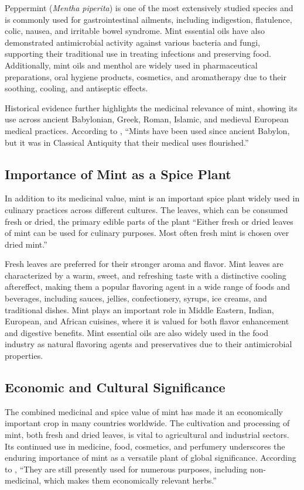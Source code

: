 Peppermint (\textit{Mentha piperita}) is one of the most extensively studied species and is commonly used for gastrointestinal ailments, including indigestion, flatulence, colic, nausea, and irritable bowel syndrome. Mint essential oils have also demonstrated antimicrobial activity against various bacteria and fungi, supporting their traditional use in treating infections and preserving food. Additionally, mint oils and menthol are widely used in pharmaceutical preparations, oral hygiene products, cosmetics, and aromatherapy due to their soothing, cooling, and antiseptic effects.

Historical evidence further highlights the medicinal relevance of mint, showing its use across ancient Babylonian, Greek, Roman, Islamic, and medieval European medical practices. According to \textcite{Silva2020}, ``Mints have been used since ancient Babylon, but it was in Classical Antiquity that their medical uses flourished.''

\subsection{Importance of Mint as a Spice Plant}
In addition to its medicinal value, mint is an important spice plant widely used in culinary practices across different cultures. The leaves, which can be consumed fresh or dried, the primary edible parts of the plant ``Either fresh or dried leaves of mint can be used for culinary purposes. Most often fresh mint is chosen over dried mint.''

Fresh leaves are preferred for their stronger aroma and flavor. Mint leaves are characterized by a warm, sweet, and refreshing taste with a distinctive cooling aftereffect, making them a popular flavoring agent in a wide range of foods and beverages, including sauces, jellies, confectionery, syrups, ice creams, and traditional dishes. Mint plays an important role in Middle Eastern, Indian, European, and African cuisines, where it is valued for both flavor enhancement and digestive benefits. Mint essential oils are also widely used in the food industry as natural flavoring agents and preservatives due to their antimicrobial properties.

\subsection{Economic and Cultural Significance}
The combined medicinal and spice value of mint has made it an economically important 
crop in many countries worldwide. The cultivation and processing of mint, 
both fresh and dried leaves, is vital to agricultural and industrial sectors. 
Its continued use in medicine, food, cosmetics, and perfumery underscores the 
enduring importance of mint as a versatile plant of global significance. 
According to \textcite{Silva2020}, ``They are still presently used for numerous 
purposes, including non-medicinal, which makes them economically relevant herbs.''

